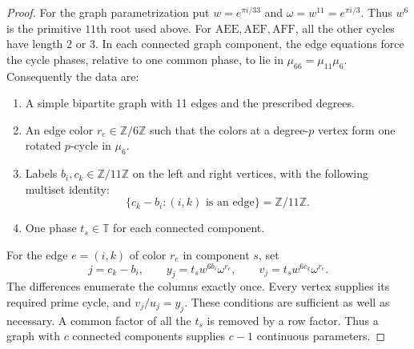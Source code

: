 \documentclass[11pt,a4paper]{article}
\theoremstyle{plain}
\theoremstyle{definition}
\theoremstyle{plain}
\begin{document}
\begin{proof}
\medskip
For the graph parametrization put $w=e^{\pi i/33}$ and $\omega=w^{11}=e^{\pi i/3}$. Thus $w^6$ is the primitive $11$th root used above. For $\mathrm{AEE},\mathrm{AEF},\mathrm{AFF}$, all the other cycles have length $2$ or $3$. In each connected graph component, the edge equations force the cycle phases, relative to one common phase, to lie in $\mu_{66}=\mu_{11}\mu_6$. Consequently the data are:
\par\noindent
\begin{minipage}{\linewidth}
\begin{enumerate}
\item A simple bipartite graph with 11 edges and the prescribed degrees.
\item An edge color $r_e\in\mathbb{Z}/6\mathbb{Z}$ such that the colors at a degree-$p$ vertex form one rotated $p$-cycle in $\mu_6$.
\item Labels $b_i,c_k\in\mathbb{Z}/11\mathbb{Z}$ on the left and right vertices, with the following multiset identity:
$$\{c_k-b_i:(i,k)\text{ is an edge}\}=\mathbb{Z}/11\mathbb{Z}.$$
\item One phase $t_s\in\mathbb{T}$ for each connected component.
\end{enumerate}
\end{minipage}\par
For the edge $e=(i,k)$ of color $r_e$ in component $s$, set
$$j=c_k-b_i,\qquad y_j=t_sw^{6b_i}\omega^{r_e},\qquad v_j=t_sw^{6c_k}\omega^{r_e}.$$
The differences enumerate the columns exactly once. Every vertex supplies its required prime cycle, and $v_j/u_j=y_j$. These conditions are sufficient as well as necessary. A common factor of all the $t_s$ is removed by a row factor. Thus a graph with $c$ connected components supplies $c-1$ continuous parameters.


\end{proof}
\end{document}
